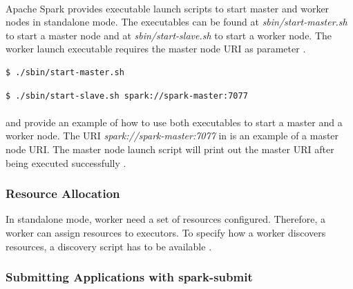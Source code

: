 \paragraph{}Apache Spark provides executable launch scripts to start master and worker nodes in standalone mode.
The executables can be found at \textit{sbin/start-master.sh} to start a master node and at \textit{sbin/start-slave.sh} to start a worker node.
The worker launch executable requires the master node URI as parameter \cite{Apache2020Spark}. 


\begin{lstlisting}[label=lst:04_spark_standalone_launch-master, caption=Usage of master launch script, language=bash]
$ ./sbin/start-master.sh
\end{lstlisting}


\begin{lstlisting}[label=lst:04_spark_standalone_launch-worker, caption=Usage of worker launch script, language=bash]
$ ./sbin/start-slave.sh spark://spark-master:7077
\end{lstlisting}


\paragraph{} and  provide an example of how to use both executables to start a master and a worker node. The URI \textit{spark://spark-master:7077} in  is an example of a master node URI. The master node launch script will print out the master URI after being executed successfully \cite{Apache2020Spark}.


\subsubsection{Resource Allocation}
\label{subsubsec:04_spark_standalone_res-alloc}
In standalone mode, worker need a set of resources configured. Therefore, a worker can assign resources to executors.
To specify how a worker discovers resources, a discovery script has to be available \cite{Apache2020Spark}.


\subsubsection{Submitting Applications with spark-submit}
\label{subsubsec:04_spark_standalone_submit}
